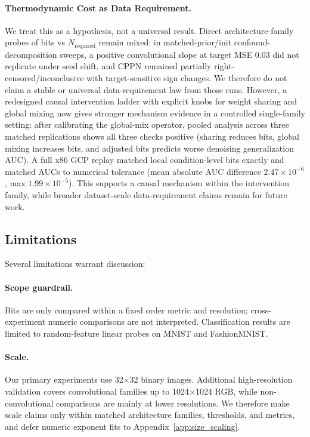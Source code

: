 \documentclass{article}
\begin{document}
\paragraph{Thermodynamic Cost as Data Requirement.} We treat this as a hypothesis, not a universal result. Direct architecture-family probes of bits vs $N_{\text{required}}$ remain mixed: in matched-prior/init confound-decomposition sweeps, a positive convolutional slope at target MSE $0.03$ did not replicate under seed shift, and CPPN remained partially right-censored/inconclusive with target-sensitive sign changes. We therefore do not claim a stable or universal data-requirement law from those runs. However, a redesigned causal intervention ladder with explicit knobs for weight sharing and global mixing now gives stronger mechanism evidence in a controlled single-family setting: after calibrating the global-mix operator, pooled analysis across three matched replications shows all three checks positive (sharing reduces bits, global mixing increases bits, and adjusted bits predicts worse denoising generalization AUC). A full x86 GCP replay matched local condition-level bits exactly and matched AUCs to numerical tolerance (mean absolute AUC difference $2.47\times10^{-6}$, max $1.99\times10^{-5}$). This supports a causal mechanism within the intervention family, while broader dataset-scale data-requirement claims remain for future work.

\subsection{Limitations}
\label{sec:limitations}

Several limitations warrant discussion:

\paragraph{Scope guardrail.} Bits are only compared within a fixed order metric and resolution; cross-experiment numeric comparisons are not interpreted. Classification results are limited to random-feature linear probes on MNIST and FashionMNIST.

\paragraph{Scale.} Our primary experiments use 32$\times$32 binary images. Additional high-resolution validation covers convolutional families up to 1024$\times$1024 RGB, while non-convolutional comparisons are mainly at lower resolutions. We therefore make scale claims only within matched architecture families, thresholds, and metrics, and defer numeric exponent fits to Appendix~\ref{app:size_scaling}.
\end{document}
